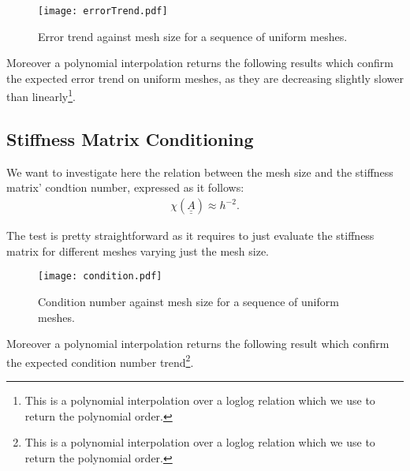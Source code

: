 \begin{figure}[!ht]
	\centering
	\texttt{[image: errorTrend.pdf]}
	\caption{Error trend against mesh size for a sequence of uniform meshes.}
\end{figure}

\newpage
\noindent Moreover a polynomial interpolation returns the following results which confirm the expected error trend on uniform meshes, as they are decreasing slightly slower than linearly\footnote{This is a polynomial interpolation over a loglog relation which we use to return the polynomial order.}.



\newpage
\subsection{Stiffness Matrix Conditioning} \label{condition}

We want to investigate here the relation between the mesh size and the stiffness matrix' condtion number, expressed as it follows:
\begin{gather}
	\chi(\underline{\underline{A}}) \approx h^{-2}.
\end{gather}

The test is pretty straightforward as it requires to just evaluate the stiffness matrix for different meshes varying just the mesh size.

\begin{figure}[!ht]
	\centering
	\texttt{[image: condition.pdf]}
	\caption{Condition number against mesh size for a sequence of uniform meshes.}
\end{figure}

\newpage
\noindent Moreover a polynomial interpolation returns the following result which confirm the expected condition number trend\footnote{This is a polynomial interpolation over a loglog relation which we use to return the polynomial order.}.

